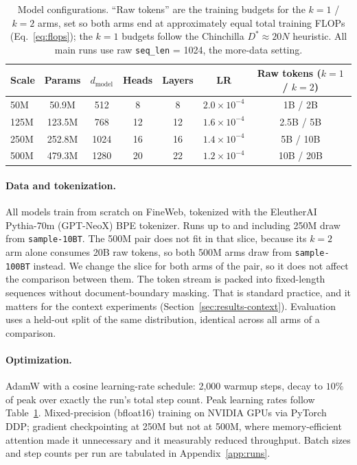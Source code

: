 \documentclass[11pt]{article}
\newcommand{\dmodel}{d_{\mathrm{model}}}
\begin{document}
\begin{table}[h]
\centering
\caption{Model configurations. ``Raw tokens'' are the training budgets for
the $k{=}1$ / $k{=}2$ arms, set so both arms end at approximately equal
total training FLOPs (Eq.~\ref{eq:flops}); the $k{=}1$ budgets follow the
Chinchilla $D^\ast \approx 20N$ heuristic. All main runs use raw
\texttt{seq\_len} = 1024, the more-data setting.}
\label{tab:models}
\vspace{0.4em}
\begin{tabular}{lcccccc}
\toprule
Scale & Params & $\dmodel$ & Heads & Layers & LR & Raw tokens ($k{=}1$ / $k{=}2$) \\
\midrule
50M  & 50.9M  & 512  & 8  & 8  & $2.0\times10^{-4}$ & 1B / 2B \\
125M & 123.5M & 768  & 12 & 12 & $1.6\times10^{-4}$ & 2.5B / 5B \\
250M & 252.8M & 1024 & 16 & 16 & $1.4\times10^{-4}$ & 5B / 10B \\
500M & 479.3M & 1280 & 20 & 22 & $1.2\times10^{-4}$ & 10B / 20B \\
\bottomrule
\end{tabular}
\end{table}

\paragraph{Data and tokenization.}
All models train from scratch on FineWeb, tokenized with the EleutherAI
Pythia-70m (GPT-NeoX) BPE tokenizer. Runs up to and including 250M draw from
\texttt{sample-10BT}. The 500M pair does not fit in that slice, because its
$k{=}2$ arm alone consumes 20B raw tokens, so both 500M arms draw from
\texttt{sample-100BT} instead. We change the slice for both arms of the pair,
so it does not affect the comparison between them.
The token stream is packed into fixed-length sequences without
document-boundary masking. That is standard practice, and it matters for the
context experiments (Section~\ref{sec:results-context}). Evaluation uses a
held-out split of the same distribution, identical across all arms of a
comparison.

\paragraph{Optimization.}
AdamW with a cosine learning-rate schedule: 2{,}000 warmup steps, decay to
$10\%$ of peak over exactly the run's total step count. Peak learning rates
follow Table~\ref{tab:models}. Mixed-precision (bfloat16) training on
NVIDIA GPUs via PyTorch DDP; gradient checkpointing at 250M but not at 500M,
where memory-efficient attention made it unnecessary and it measurably
reduced throughput. Batch sizes and step counts per run are tabulated in
Appendix~\ref{app:runs}.
\end{document}

